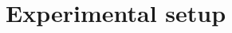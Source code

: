 \documentclass{article} %
\newcommand{\R}{\mathbb{R}}
\newcommand{\charlie}[1]{ {\color{red}[CCB: #1]}}
\newcommand{\alekh}[1]{ {\color{brown}[AA: #1]}}
\newcommand{\amirg}[1]{ {\color{green}[AG: #1]}}
\begin{document}







\section{Experimental setup}\label{sec:exp-setup}


\end{document}
